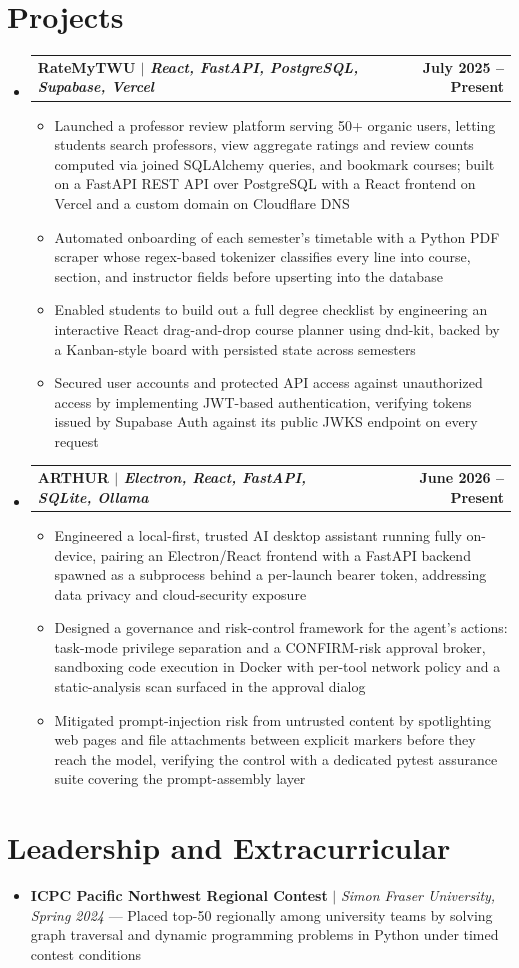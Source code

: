 \documentclass[letterpaper,10pt]{article}
\makeatletter
\newcommand{\resumeItem}[1]{\item\small{#1 \vspace{-2pt}}}
\newcommand{\resumeSkill}[1]{\item[]\small{#1 \vspace{-2pt}}}
\newcommand{\resumeProjectHeading}[2]{%
  \item[]
    \begin{tabular*}{1.001\textwidth}{l@{\extracolsep{\fill}}r}
      \textbf{#1} & \textbf{\small #2}\\
    \end{tabular*}\vspace{-4pt}
}
\newcommand{\resumeSubHeadingListStart}{\begin{itemize}[leftmargin=0in, itemsep=0pt]}
\newcommand{\resumeSubHeadingListEnd}{\end{itemize}}
\newcommand{\resumeItemListStart}{\begin{itemize}[leftmargin=0.18in, label=\raisebox{0.2ex}{\scriptsize\textbullet}, itemsep=0pt, topsep=4pt]}
\newcommand{\resumeItemListEnd}{\end{itemize}\vspace{-2pt}}
\makeatother
\begin{document}
\section{Projects}
\resumeSubHeadingListStart
\resumeProjectHeading
  {\textbf{RateMyTWU} $|$ \emph{React, FastAPI, PostgreSQL, Supabase, Vercel}}{July 2025 -- Present}
\resumeItemListStart
    \resumeItem{Launched a professor review platform serving 50+ organic users, letting students search professors, view aggregate ratings and review counts computed via joined SQLAlchemy queries, and bookmark courses; built on a FastAPI REST API over PostgreSQL with a React frontend on Vercel and a custom domain on Cloudflare DNS}
    \resumeItem{Automated onboarding of each semester's timetable with a Python PDF scraper whose regex-based tokenizer classifies every line into course, section, and instructor fields before upserting into the database}
    \resumeItem{Enabled students to build out a full degree checklist by engineering an interactive React drag-and-drop course planner using dnd-kit, backed by a Kanban-style board with persisted state across semesters}
    \resumeItem{Secured user accounts and protected API access against unauthorized access by implementing JWT-based authentication, verifying tokens issued by Supabase Auth against its public JWKS endpoint on every request}
\resumeItemListEnd
\resumeProjectHeading
  {\textbf{ARTHUR} $|$ \emph{Electron, React, FastAPI, SQLite, Ollama}}{June 2026 -- Present}
\resumeItemListStart
    \resumeItem{Engineered a local-first, trusted AI desktop assistant running fully on-device, pairing an Electron/React frontend with a FastAPI backend spawned as a subprocess behind a per-launch bearer token, addressing data privacy and cloud-security exposure}
    \resumeItem{Designed a governance and risk-control framework for the agent's actions: task-mode privilege separation and a CONFIRM-risk approval broker, sandboxing code execution in Docker with per-tool network policy and a static-analysis scan surfaced in the approval dialog}
    \resumeItem{Mitigated prompt-injection risk from untrusted content by spotlighting web pages and file attachments between explicit markers before they reach the model, verifying the control with a dedicated pytest assurance suite covering the prompt-assembly layer}
\resumeItemListEnd
\resumeSubHeadingListEnd
\vspace{-5pt}
\section{Leadership and Extracurricular}
\resumeSubHeadingListStart
    \resumeSkill{\textbf{ICPC Pacific Northwest Regional Contest} $|$ \emph{Simon Fraser University, Spring 2024} --- Placed top-50 regionally among university teams by solving graph traversal and dynamic programming problems in Python under timed contest conditions}
\resumeSubHeadingListEnd
\end{document}
